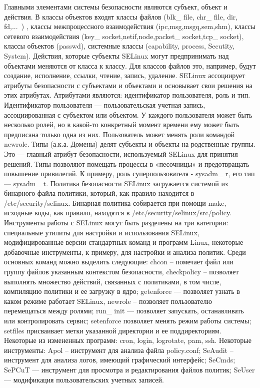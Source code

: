 Главными элементами системы безопасности являются субъект, объект и действия. В классы объектов входят классы файлов (blk\_ file, chr\_ file, dir, fd,...\ ) ,  классы межпроцессного взаимодействия (ipc,msg,msgq,sem,shm), классы сетевого взаимодействия (key\_ socket,netif,node,packet\_ socket,tcp\_ socket), классы объектов (passwd), системные классы (capability, process, Secutity, System). Действия, которые субъекты SELinux могут предпринимать над объектами меняются от класса к классу. Для классов файлов это, например, будут создание, исполнение, ссылки, чтение, запись, удаление. SELinux ассоциирует атрибуты безопасности с субъектами и объектами и основывает свои решения на этих атрибутах. Атрибутами являются: идентификатор пользователя, роль и тип. Идентификатор пользователя — пользовательская учетная запись, ассоциированная с субъектом или объектом. У каждого пользователя может быть несколько ролей, но в какой-то конкретный момент времени ему может быть предписана только одна из них. Пользователь может менять роли командой newrole. Типы (а.к.а. Домены) делят субъекты и объекты на родственные группы. Это — главный атрибут безопасности, используемый SELinux для принятия решений. Типы позволяют помещать процессы в «песочницы» и предотвращать повышение привилегий. К примеру, роль суперпользователя - sysadm\_ r, его тип — sysadm\_ t. Политика безопасности SELinux загружается системой из бинарного файла политики, который, как правило находится в /etc/security/selinux. Бинарная политика собирается при помощи make, исходные коды, как правило, находятся в /etc/security/selinux/src/policy. Инструменты работы с SELinux могут быть разделены на три категории: специальные утилиты для настройки и использования SELinux, модифицированные версии стандартных команд и программ Linux, некоторые добавочные инструменты, к примеру, для настройки и анализа политик. Среди основных команд можно выделить следующие: chcon – помечает файл или группу файлов указанным контекстом безопасности, checkpolicy – позволяет выполнять множество действий, связанных с политиками, в том числе, компиляцию политики и ее загрузку в ядро; getenforce — позволяет узнать в каком режиме работает SELinux, newrole – позволяет пользователю перемещаться между ролями; run\_ init — позволяет запускать, останавливать или контролировать сервис; setenforce позволяет менять режим работы системы; setfiles присваивает метки указанной директории и ее поддиректориям. Некоторые из измененных программ: cron, login, logrotate, pam, ssh. Некоторые инструменты: Apol – инструмент для анализа файла policy.conf; SeAudit – инструмент для анализа логов, имеющий графический интерфейс; SeCmds; SePCuT — инструмент для просмотра и редактирования файлов политик; SeUser — модификация пользовательских учетных записей. 

